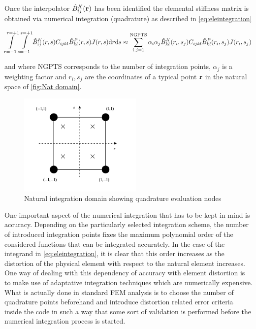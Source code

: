 Once the interpolator $\hat{B}_{ij}^K(\vb{r})$ has been identified the elemental stiffness matrix is obtained via numerical integration (quadrature) as described in \eqref{eq:eleintegration}

\begin{equation}
\int\limits_{r=-1}^{r=+1}\int\limits_{s=-1}^{s=+1} \hat{B}_{ij}^K(r,s) C_{ijkl} \hat{B}_{kl}^P(r,s)J(r,s) \mathrm{d}r\mathrm{d}s\approx \sum_{i,j=1}^\text{NGPTS} \alpha_i \alpha_j \hat{B}_{kl}^K(r_i,s_j)C_{ijkl} \hat{B}_{kl}^P(r_i,s_j) J(r_i,s_j)
\label{eq:eleintegration}
\end{equation}


and where NGPTS corresponds to the number of integration points, $\alpha_j$ is a weighting factor and $r_i,s_j$   are the coordinates of a typical point $\vb{r}$ in the natural space of \cref{fig:Nat domain}.

 
\begin{figure}[h]
\centering
\includegraphics[width=6cm]{figure4.pdf}
\caption{Natural integration domain showing quadrature evaluation nodes}
\label{fig:integration domain}
\end{figure}	 


One important aspect of the numerical integration that has to be kept in mind is accuracy.  Depending on the particularly selected integration scheme, the number of introduced integration points fixes the maximum polynomial order of the considered functions that can be integrated accurately.  In the case of the integrand in \cref{eq:eleintegration}, it is clear that this order increases as the distortion of the physical element  with respect to the natural element increases.  One way of dealing with this dependency of accuracy with element distortion is to make use of adaptative integration techniques which are numerically expensive.  What is actually done in standard FEM analysis is to choose the number of quadrature points beforehand and introduce distortion related error criteria inside the code in such a way that some sort of validation is performed before the numerical integration process is started.

